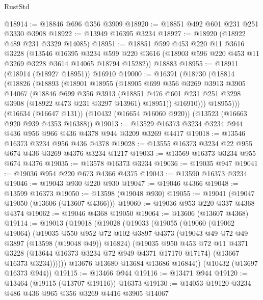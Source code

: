 \begin{lexlean}{RustStd}
\begin{coremodule}
@18914 := @18846 @696 @356 @3909
@18920 := @18851 @492 @601 @231 @251 @3330 @3908
@18922 := @13949 @16395 @3234
@18927 := @18920 (@18922 @489 @231 @3329 @14085)
@18951 := @18851
    @599
    @453
    @220
    @11
    @3616
    @3228
    (@13546
      @16395
      @3234
      @599
      @220
      @3616
      (@18903 @596 @220 @453 @11 @3269 @3228 @3614 @14065 @18794 @15282))
    @18883
@18955 := @18911 (@18914 (@18927 @18951)) @16910
@19000 := @16391
    (@18730
      (@18814
        (@18826
          (@18893
            (@18901
              @18955
              (@18905
                @699
                @356
                @3269
                @3913
                @3905
                @14067
                (@18846
                  @699
                  @356
                  @3913
                  (@18851 @476 @601 @231 @251 @3298 @3908 (@18922 @473 @231 @3297 @13961) @18951))
                @16910)))
          @18955)))
    (@16634 (@16647 @131))
    (@10432 (@16654 @16060 @920))
    (@13523 (@16663 @920 @939 @4353 @16388))
@19013 := @13529 @16373 @3234 @3234 @944 @436 @956 @966 @436 @4378 @944 @3209 @3269 @4417
@19018 := @13546 @16373 @3234 @956 @436 @4378
@19028 := @13555 @16373 @3234 @22 @955 @674 @436 @3269 @4376 @3234 @1217
@19033 := @13569 @16373 @3234 @955 @674 @4376
@19035 := @13578 @16373 @3234
@19036 := @19035 @947
@19041 := @19036 @954 @220 @673 @4366 @4375
@19043 := @13590 @16373 @3234
@19046 := @19043 @930 @220 @930
@19047 := @19046 @4366
@19048 := @13599 @16373
@19050 := @13598 (@19048 @930)
@19055 := @19041 (@19047 @19050 (@13606 (@13607 @4366)))
@19060 := @19036 @953 @220 @337 @4368 @4374
@19062 := @19046 @4368 @19050
@19064 := @13606 (@13607 @4368)
@19114 := @19013
    (@19018
      (@19028
        (@19033
          (@19055
            (@19060
              (@19062 @19064)
              (@19035
                @550
                @952
                @72
                @102
                @3897
                @4373
                (@19043 @49 @72 @49 @3897 (@13598 (@19048 @49)) @16824)
                (@19035
                  @950
                  @453
                  @72
                  @11
                  @4371
                  @3228
                  (@13644 @16373 @3234 @72 @949 @4371 @17170 @17174)
                  (@13667 @16373 @3234))))))
        @13676
        @13680
        @13684
        @13686
        @16844))
    (@10432 (@13697 @16373 @944))
@19115 := @13466 @944
@19116 := @13471 @944
@19120 := @13464 (@19115 (@13707 @19116)) @16373
@19130 := @14053 @19120 @3234 @486 @436 @965 @356 @3269 @4416 @3905 @14067

\end{coremodule}
\end{lexlean}

